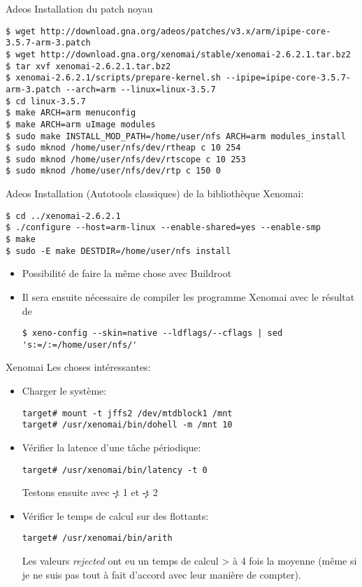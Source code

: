 \begin{frame}[fragile=singleslide]{Adeos}
  Installation du patch noyau
  \begin{lstlisting}
$ wget http://download.gna.org/adeos/patches/v3.x/arm/ipipe-core-3.5.7-arm-3.patch
$ wget http://download.gna.org/xenomai/stable/xenomai-2.6.2.1.tar.bz2
$ tar xvf xenomai-2.6.2.1.tar.bz2
$ xenomai-2.6.2.1/scripts/prepare-kernel.sh --ipipe=ipipe-core-3.5.7-arm-3.patch --arch=arm --linux=linux-3.5.7
$ cd linux-3.5.7
$ make ARCH=arm menuconfig
$ make ARCH=arm uImage modules
$ sudo make INSTALL_MOD_PATH=/home/user/nfs ARCH=arm modules_install
$ sudo mknod /home/user/nfs/dev/rtheap c 10 254
$ sudo mknod /home/user/nfs/dev/rtscope c 10 253
$ sudo mknod /home/user/nfs/dev/rtp c 150 0
  \end{lstlisting}
\end{frame}

\begin{frame}[fragile=singleslide]{Adeos}
  Installation (Autotools classiques) de la bibliothèque Xenomai:
  \begin{lstlisting}
$ cd ../xenomai-2.6.2.1
$ ./configure --host=arm-linux --enable-shared=yes --enable-smp
$ make
$ sudo -E make DESTDIR=/home/user/nfs install
  \end{lstlisting}
  \begin{itemize} 
  \item   Possibilité de faire la même chose avec Buildroot
  \item Il  sera ensuite nécessaire de compiler  les programme Xenomai
    avec le résultat de
    \begin{lstlisting} 
$ xeno-config --skin=native --ldflags/--cflags | sed 's:=/:=/home/user/nfs/'
    \end{lstlisting} 
  \end{itemize} 
\end{frame}

\begin{frame}[fragile=singleslide]{Xenomai}
  Les choses intéressantes:
  \begin{itemize}
  \item Charger le système:
    \begin{lstlisting}
target# mount -t jffs2 /dev/mtdblock1 /mnt
target# /usr/xenomai/bin/dohell -m /mnt 10
    \end{lstlisting}
  \item Vérifier la latence d'une tâche périodique:
    \begin{lstlisting}
target# /usr/xenomai/bin/latency -t 0
    \end{lstlisting}
    Testons ensuite avec \c{-t 1} et \c{-t 2}
  \item Vérifier le temps de calcul sur des flottants:
    \begin{lstlisting}
target# /usr/xenomai/bin/arith
    \end{lstlisting}
    Les valeurs \emph{rejected}  ont eu un temps de calcul  > à 4 fois
    la moyenne (même si je ne  suis pas tout à fait d'accord avec leur
    manière de compter).
  \end{itemize}
\end{frame}

